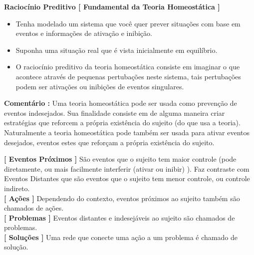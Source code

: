 \documentclass[10pt,a4paper]{report}
\begin{document}
\hspace{\baselineskip}

\textbf{Raciocínio Preditivo  [ Fundamental da Teoria Homeostática ]} 

\begin{itemize}
	\item[ (i) ] Tenha modelado um sistema que você quer prever situações com base em eventos e informações de ativação e inibição.
	\item[ (ii) ] Suponha uma situação real que é vista inicialmente em equilíbrio. 
	\item[ (iii) ] O raciocínio preditivo da teoria homeostática consiste em imaginar o que acontece através de pequenas pertubações neste sistema, tais pertubações podem ser ativações ou inibições de eventos singulares.
\end{itemize}

\textbf{Comentário :} Uma teoria homeostática pode ser usada como prevenção de eventos indesejados. Sua finalidade consiste em de alguma maneira criar estratégias que reforcem a própria existência do sujeito (do que usa a teoria). Naturalmente a teoria homeostática pode também ser usada para ativar eventos desejados, eventos estes que reforçam a própria existência do sujeito.

\hspace{\baselineskip}

\textbf{[ Eventos Próximos ]} São eventos que o sujeito tem maior controle (pode diretamente, ou mais facilmente interferir (ativar ou inibir) ). Faz contraste com Eventos Distantes que são eventos que o sujeito tem menor controle, ou controle indireto.\\

\textbf{[ Ações ]} Dependendo do contexto, eventos próximos ao sujeito também são chamados de ações. \\

\textbf{[ Problemas ]} Eventos distantes e indesejáveis ao sujeito são chamados de problemas.\\

\textbf{[ Soluções ]} Uma rede que conecte uma ação a um problema é chamado de solução.\\
\end{document}
